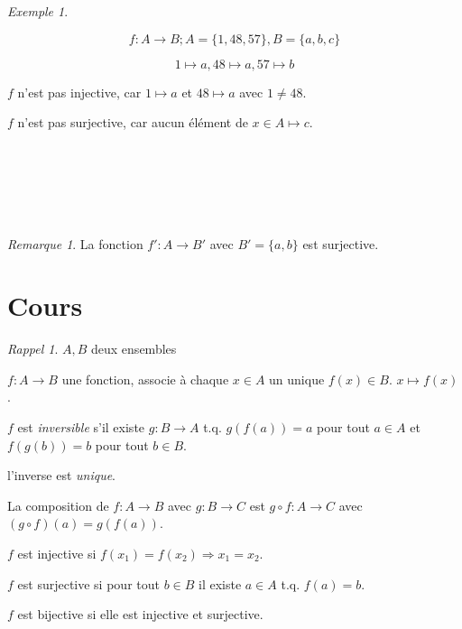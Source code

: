 \documentclass{report}
\newcounter{cours}
\newcommand*{\cours}{\section*{Cours \thecours}\stepcounter{cours}}
\theoremstyle{definition}
\theoremstyle{remark}
\newtheorem*{exem}{Exemple}
\newtheorem*{rema}{Remarque}
\newtheorem*{rappel}{Rappel}
\begin{document}
\begin{exem}
\begin{ulist}
			\item 
			\[
			f:A \to B; A=\{1,48,57\}, B=\{a,b,c\}
			\]
			
			\[
			1 \mapsto a, 48 \mapsto a, 57 \mapsto b
			\]
			
			$f$ n'est pas injective, car $1 \mapsto a$ et $48 \mapsto a$  avec $1 \neq 48$.
			
			$f$ n'est pas surjective, car aucun \'el\'ement de $x \in A \mapsto c$.
		\end{ulist}
		

		~

		

		~

		

		~

		
	\end{exem}

	\begin{rema}
		La fonction $f':A \to B'$ avec $B'=\{a,b\}$ est surjective.
	\end{rema}


	\cours
	\begin{rappel}
		$A, B$ deux ensembles

		\begin{ulist}[noitemsep]
			\item $f:A \to B$ une fonction, associe \`a chaque $x \in A$ un unique $f(x) \in B$. $x \mapsto f(x)$.
			\item $f$ est \emph{inversible} s'il existe $g:B \to A$ t.q. $g(f(a))=a$ pour tout $a \in A$ et $f(g(b))=b$ pour tout $b \in B$.
			\item l'inverse est \emph{unique}.
			\item La composition de $f:A \to B$ avec $g:B \to C$ est $g \circ f:A \to C$ avec $(g \circ f)(a)=g(f(a))$.
			\item $f$ est injective si $f(x_1)=f(x_2) \Rightarrow x_1=x_2$.
			\item $f$ est surjective si pour tout $b \in B$ il existe $a \in A$ t.q. $f(a)=b$.
			\item $f$ est bijective si elle est injective et surjective.
		\end{ulist}
	\end{rappel}
\end{document}
